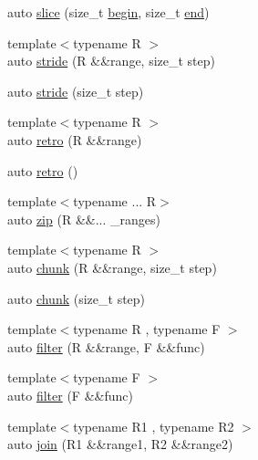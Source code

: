 \begin{DoxyCompactItemize}
auto \mbox{\hyperlink{namespace_r_a_h___n_a_m_e_s_p_a_c_e_1_1view_af14d4072d2e0799f4b4391307e086c0f}{slice}} (size\+\_\+t \mbox{\hyperlink{namespace_r_a_h___n_a_m_e_s_p_a_c_e_a40db588db40ca52dae948613525ac1b4}{begin}}, size\+\_\+t \mbox{\hyperlink{namespace_r_a_h___n_a_m_e_s_p_a_c_e_ad5f90a809a5221569377c400175a20bf}{end}})
\item 
{\footnotesize template$<$typename R $>$ }\\auto \mbox{\hyperlink{namespace_r_a_h___n_a_m_e_s_p_a_c_e_1_1view_a510c62d1b397ade76b0fd5781d5b8448}{stride}} (R \&\&range, size\+\_\+t step)
\item 
auto \mbox{\hyperlink{namespace_r_a_h___n_a_m_e_s_p_a_c_e_1_1view_ab23b0277ae97dfa110e3055e80572d85}{stride}} (size\+\_\+t step)
\item 
{\footnotesize template$<$typename R $>$ }\\auto \mbox{\hyperlink{namespace_r_a_h___n_a_m_e_s_p_a_c_e_1_1view_a4d4a106caf2572f8a50895cb8399397a}{retro}} (R \&\&range)
\item 
auto \mbox{\hyperlink{namespace_r_a_h___n_a_m_e_s_p_a_c_e_1_1view_a4fc357c166e9ac704adda574a1cc3a87}{retro}} ()
\item 
{\footnotesize template$<$typename ... R$>$ }\\auto \mbox{\hyperlink{namespace_r_a_h___n_a_m_e_s_p_a_c_e_1_1view_ad2ae22a5f8e0df5b5abea7da154f6b33}{zip}} (R \&\&... \+\_\+ranges)
\item 
{\footnotesize template$<$typename R $>$ }\\auto \mbox{\hyperlink{namespace_r_a_h___n_a_m_e_s_p_a_c_e_1_1view_a946e1de327673cea84d3daacbb95df1d}{chunk}} (R \&\&range, size\+\_\+t step)
\item 
auto \mbox{\hyperlink{namespace_r_a_h___n_a_m_e_s_p_a_c_e_1_1view_a05946dc9ac0988bc420dc44094d38481}{chunk}} (size\+\_\+t step)
\item 
{\footnotesize template$<$typename R , typename F $>$ }\\auto \mbox{\hyperlink{namespace_r_a_h___n_a_m_e_s_p_a_c_e_1_1view_a06496211184d63bcf2a7e091f6710164}{filter}} (R \&\&range, F \&\&func)
\item 
{\footnotesize template$<$typename F $>$ }\\auto \mbox{\hyperlink{namespace_r_a_h___n_a_m_e_s_p_a_c_e_1_1view_a45acfa62cf05ef407a766b6c038b06cd}{filter}} (F \&\&func)
\item 
{\footnotesize template$<$typename R1 , typename R2 $>$ }\\auto \mbox{\hyperlink{namespace_r_a_h___n_a_m_e_s_p_a_c_e_1_1view_a0458ad47a1a488d40cc98913042a6cb2}{join}} (R1 \&\&range1, R2 \&\&range2)

\end{DoxyCompactItemize}
